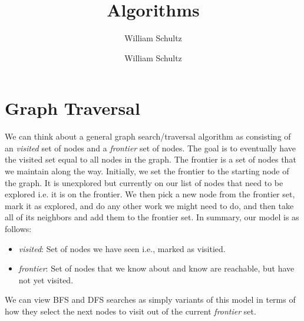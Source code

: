 \documentclass[10pt,a4paper]{article}
\author{William Schultz}
\begin{document}
\title{Algorithms}
\author{William Schultz}
\maketitle

\newcommand{\concept}[1]{\textcolor{blue}{\textit{\textbf{#1}}}}

\section{Graph Traversal}

We can think about a general graph search/traversal algorithm as consisting of an \textit{visited} set of nodes and a \textit{frontier} set of nodes. The goal is to eventually have the visited set equal to all nodes in the graph. The frontier is a set of nodes that we maintain along the way. Initially, we set the frontier to the starting node of the graph. It is unexplored but currently on our list of nodes that need to be explored i.e. it is on the frontier. We then pick a new node from the frontier set, mark it as explored, and do any other work we might need to do, and then take all of its neighbors and add them to the frontier set. In summary, our model is as follows:

\begin{itemize}
    \item \textit{visited}: Set of nodes we have seen i.e., marked as visitied.
    \item \textit{frontier}: Set of nodes that we know about and know are reachable, but have not yet visited.
\end{itemize}
We can view BFS and DFS searches as simply variants of this model in terms of how they select the next nodes to visit out of the current \textit{frontier} set. 
\end{document}
